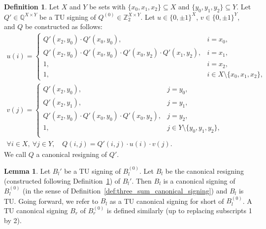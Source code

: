 \documentclass{article}
\theoremstyle{definition}
\newtheorem{lemma}[theorem]{Lemma}
\newtheorem{definition}[theorem]{Definition}
\begin{document}
\begin{definition}\label{def:three_sum_canonical_resigning}
    Let $X$ and $Y$ be sets with $\{x_{0}, x_{1}, x_{2}\} \subseteq X$ and $\{y_{0}, y_{1}, y_{2}\} \subseteq Y$. Let $Q' \in \mathbb{Q}^{X \times Y}$ be a TU signing of $Q^{(0)} \in \mathbb{Z}_{2}^{X \times Y}$. Let $u \in \{0, \pm 1\}^{X}$, $v \in \{0, \pm 1\}^{Y}$, and $Q$ be constructed as follows:
    \begin{gather*}
        u(i) = \begin{cases}
            Q' (x_{2}, y_{0}) \cdot Q' (x_{0}, y_{0}), & i = x_{0}, \\
            Q' (x_{2}, y_{0}) \cdot Q' (x_{0}, y_{0}) \cdot Q' (x_{0}, y_{2}) \cdot Q' (x_{1}, y_{2}), & i = x_{1}, \\
            1, & i = x_{2}, \\
            1, & i \in X \setminus \{x_{0}, x_{1}, x_{2}\},
        \end{cases} \\
        v(j) = \begin{cases}
            Q' (x_{2}, y_{0}), & j = y_{0}, \\
            Q' (x_{2}, y_{1}), & j = y_{1}, \\
            Q' (x_{2}, y_{0}) \cdot Q' (x_{0}, y_{0}) \cdot Q' (x_{0}, y_{2}), & j = y_{2}, \\
            1, & j \in Y \setminus \{y_{0}, y_{1}, y_{2}\}, \\
        \end{cases} \\
        \forall i \in X, \ \forall j \in Y, \quad Q (i, j) = Q' (i, j) \cdot u(i) \cdot v(j).
    \end{gather*}
    We call $Q$ a canonical resigning of $Q'$.
\end{definition}

\begin{lemma}\label{lem:three_sum_canonical_signing_construction}
    Let $B_{l}'$ be a TU signing of $B_{l}^{(0)}$. Let $B_{l}$ be the canonical resigning (constructed following Definition~\ref{def:three_sum_canonical_resigning}) of $B_{l}'$. Then $B_{l}$ is a canonical signing of $B_{l}^{(0)}$ (in the sense of Definition~\ref{def:three_sum_canonical_signing}) and $B_{l}$ is TU. Going forward, we refer to $B_{l}$ as a TU canonical signing for short of $B_{l}^{(0)}$. A TU canonical signing $B_{r}$ of $B_{r}^{(0)}$ is defined similarly (up to replacing subscripts 1 by 2).
\end{lemma}
\end{document}
